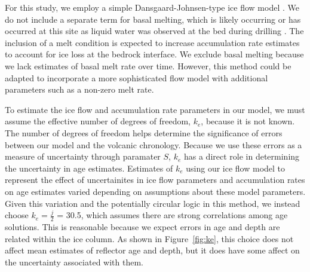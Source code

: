 For this study, we employ a simple Dansgaard-Johnsen-type ice flow model \citep{schwander2001}. We do not include a separate term for basal melting, which is likely occurring or has occurred at this site as liquid water was observed at the bed during drilling \citep{gow1968}. The inclusion of a melt condition is expected to increase accumulation rate estimates to account for ice loss at the bedrock interface. We exclude basal melting because we lack estimates of basal melt rate over time. However, this method could be adapted to incorporate a more sophisticated flow model with additional parameters such as a non-zero melt rate. 



To estimate the ice flow and accumulation rate parameters in our model, we must assume the effective number of degrees of freedom, $k_e$,  because it is not known. The number of degrees of freedom helps determine the significance of errors between our model and the volcanic chronology. Because we use these errors as a measure of uncertainty through paramater $S$, $k_e$ has a direct role in determining the uncertainty in age estimates. Estimates of $k_e$ using our ice flow model to represent the effect of uncertainites in ice flow parameters and accumulation rates on age estimates varied depending on assumptions about these model parameters. Given this variation and the potentially circular logic in this method, we instead choose $k_e = \frac{j}{2}$ = 30.5, which assumes there are strong correlations among age solutions. This is reasonable because we expect errors in age and depth are related within the ice column. 
As shown in Figure~\ref{fig:ke}, this choice does not affect mean estimates of reflector age and depth, but it does have some affect on the uncertainty associated with them. 

